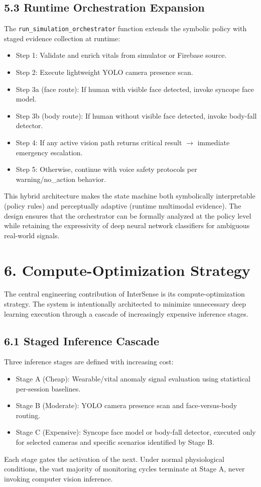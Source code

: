 \documentclass[11pt,a4paper]{article}
\begin{document}
\subsection{5.3 Runtime Orchestration Expansion}
The \texttt{run\_simulation\_orchestrator} function extends the symbolic policy with staged evidence collection at runtime:
\begin{itemize}[leftmargin=1.4em]
  \item Step 1: Validate and enrich vitals from simulator or Firebase source.
  \item Step 2: Execute lightweight YOLO camera presence scan.
  \item Step 3a (face route): If human with visible face detected, invoke syncope face model.
  \item Step 3b (body route): If human without visible face detected, invoke body-fall detector.
  \item Step 4: If any active vision path returns critical result $\rightarrow$ immediate emergency escalation.
  \item Step 5: Otherwise, continue with voice safety protocols per warning/no\_action behavior.
\end{itemize}
This hybrid architecture makes the state machine both symbolically interpretable (policy rules) and perceptually adaptive (runtime multimodal evidence). The design ensures that the orchestrator can be formally analyzed at the policy level while retaining the expressivity of deep neural network classifiers for ambiguous real-world signals.

\section{6. Compute-Optimization Strategy}
The central engineering contribution of InterSense is its compute-optimization strategy. The system is intentionally architected to minimize unnecessary deep learning execution through a cascade of increasingly expensive inference stages.

\subsection{6.1 Staged Inference Cascade}
Three inference stages are defined with increasing cost:
\begin{itemize}[leftmargin=1.4em]
  \item Stage A (Cheap): Wearable/vital anomaly signal evaluation using statistical per-session baselines.
  \item Stage B (Moderate): YOLO camera presence scan and face-versus-body routing.
  \item Stage C (Expensive): Syncope face model or body-fall detector, executed only for selected cameras and specific scenarios identified by Stage B.
\end{itemize}
Each stage gates the activation of the next. Under normal physiological conditions, the vast majority of monitoring cycles terminate at Stage A, never invoking computer vision inference.
\end{document}
